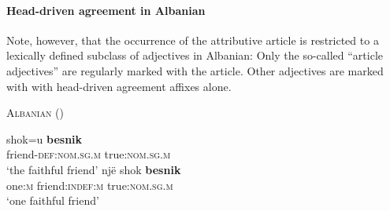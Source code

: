 \paragraph{Head-driven agreement in Albanian}
Note, however, that the occurrence of the attributive article is restricted to a lexically defined subclass of adjectives in Albanian: Only the so-called “article adjectives” are regularly marked with the article. Other adjectives are marked with with head-driven agreement affixes alone.
\begin{exe}
\ex \textsc{Albanian} (\citealt[167]{himmelmann1997})
\begin{xlist}
\ex
\gll	shok=u					\textbf{besnik}\\
	friend-\textsc{def:nom.sg.m} 	true:\textsc{nom.sg.m}\\
\glt	‘the faithful friend’
\ex
\gll 	nj\"e			shok					\textbf{besnik}\\
	one:\textsc{m}	friend:\textsc{indef:m} 	true:\textsc{nom.sg.m}\\
\glt	‘one faithful friend’
\end{xlist}
\end{exe}


